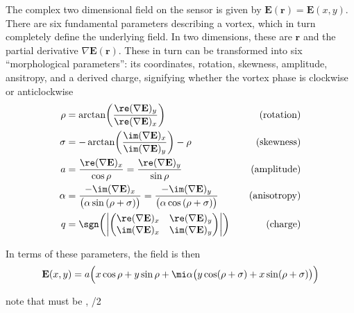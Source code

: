 The complex two dimensional field on the sensor is given by
$\mathbf{E}(\mathbf{r}) = \mathbf{E}(x,y)$.
There are six fundamental parameters describing a vortex, which in turn
completely define the underlying field.  In two dimensions, these are
$\mathbf{r}$ and the partial derivative $\nabla \mathbf{E}(\mathbf{r})$.
These in turn can be transformed into six ``morphological parameters'': its
coordinates, rotation, skewness, amplitude, ansitropy, and a derived
charge, signifying whether the vortex phase is clockwise or anticlockwise
\begingroup
\newcommand{\rx}{\re(\nabla \mathbf{E})_x}
\newcommand{\ry}{\re(\nabla \mathbf{E})_y}
\newcommand{\ix}{\im(\nabla \mathbf{E})_x}
\newcommand{\iy}{\im(\nabla \mathbf{E})_y}
\begin{align}
\rho   &= \arctan\!\left(\frac{\ry}{\rx}\right) \quad & \text{(rotation)}\\
\sigma &= -\arctan\!\left(\frac{\ix}{\iy}\right)-\rho \quad & \text{(skewness)}\\
a      &= \frac{\rx}{\cos\rho} = \frac{\ry}{\sin\rho} \quad & \text{(amplitude)}\\
\alpha &= \frac{-\ix}{\bigl(\alpha \sin\left(\rho+\sigma\right)\bigr)}
        = \frac{-\iy}{\bigl(\alpha \cos\left(\rho+\sigma\right)\bigr)} \quad & \text{(anisotropy)} \\
q      &= \sgn\!\left( \left|
          \begin{pmatrix}
          \rx & \ry \\
          \ix & \iy
          \end{pmatrix}
          \right|\right) \quad & \text{(charge)}
\end{align}
\endgroup

In terms of these parameters, the field is then
\begin{equation}
\mathbf{E}(x,y) = a \Bigl( x \cos\rho + y \sin \rho 
+ \mi \alpha \bigr(y \cos(\rho + \sigma) + x \sin(\rho+\sigma)\bigr)\Bigr)
\end{equation}

note that \rho must be \pm \pi, \sigma \pm \pi/2

